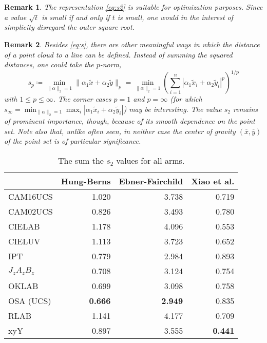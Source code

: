 \documentclass{scrartcl}
\newtheorem*{remark}{Remark}
\theoremstyle{named}
\begin{document}
\begin{remark}
  The representation \eqref{eq:s2} is suitable for optimization purposes. Since a value
  $\sqrt{t}$ is small if and only if $t$ is small, one would in the interest of
  simplicity disregard the outer square root.
\end{remark}

\begin{remark}
Besides \eqref{eq:s}, there are other meaningful ways in which the distance of a point
cloud to a line can be defined. Instead of summing the squared distances, one could take
the $p$-norm,
\[
s_p
  \coloneqq \min_{\|\alpha\|_2=1} \|\alpha_1 \tilde{x} + \alpha_2\tilde{y}\|_p
= \min_{\|\alpha\|_2=1}
  \left(\sum_{i=1}^n |\alpha_1 \tilde{x}_i + \alpha_2 \tilde{y}_i|^p\right)^{1/p}
\]
  with $1\le p \le \infty$. The corner cases $p=1$ and $p=\infty$ (for which
  $s_{\infty}=\min_{\|\alpha\|_2=1} \max_i |\alpha_1 \tilde{x}_i + \alpha_2
  \tilde{y}_i|$) may be interesting. The value $s_2$ remains of prominent importance,
  though, because of its smooth dependence on the point set.
  Note also that, unlike often seen, in neither case the center of gravity
  $(\overline{x}, \overline{y})$ of the point set is of particular significance.
\end{remark}


\begin{table}
  \centering
  \begin{tabular}{lrrr}
    \toprule
    & Hung-Berns & Ebner-Fairchild & Xiao et al.\\
    \midrule
    CAM16UCS    &         1.020  &         3.738  & 0.719\\
    CAM02UCS    &         0.826  &         3.493  & 0.780\\
    CIELAB      &         1.178  &         4.096  & 0.553\\
    CIELUV      &         1.113  &         3.723  & 0.652\\
    IPT         &         0.779  &         2.984  & 0.893\\
    $J_zA_zB_z$ &         0.708  &         3.124  & 0.754\\
    OKLAB       &         0.699  &         3.098  & 0.758\\
    OSA (UCS)   & \textbf{0.666} & \textbf{2.949} & 0.835\\
    RLAB        &         1.141  &         4.177  & 0.709\\
    xyY         &         0.897  &         3.555  & \textbf{0.441}\\
    \bottomrule
  \end{tabular}
  \caption{The sum the $s_2$ values for all arms.}
\end{table}
\end{document}
